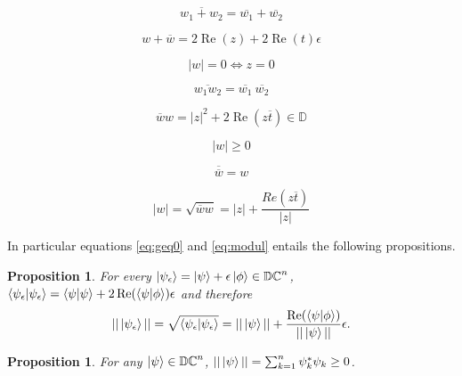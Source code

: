 \documentclass{article}
\newtheorem{proposition}[theorem]{Proposition}
\newcommand{\D}{\mathbb{D}}
\newcommand{\DC}{\mathbb{DC}}
\newcommand{\e}{\epsilon}
\renewcommand{\bar}{\overline}
\renewcommand{\Re}{\operatorname{Re}}
\begin{document}
\begin{multicols}{3}
\noindent \begin{equation}
\bar{w_1 + w_2} = \bar{w_1} + \bar{w_2}
\end{equation}

\noindent \begin{equation}
w + \bar{w} = 2 \Re(z) + 2 \Re(t) \e
\end{equation}

\noindent \begin{equation}
|w| = 0 \iff z = 0
\end{equation}

\columnbreak

\noindent \begin{equation}
\bar{w_1  w_2} = \bar{w_1} ~ \bar{w_2}
\end{equation}

\noindent \begin{equation}
\bar{w}w = |z|^2 + 2 \Re(z\bar{t}) \in \D
\end{equation}

\noindent \begin{equation}\label{eq:geq0}
|w| \geq 0
\end{equation}

\columnbreak

\noindent \begin{equation}
\bar{\bar{w}} = w
\end{equation}

\noindent \begin{equation}\label{eq:modul}
|w| = \sqrt{\bar{w}w} = |z| + \frac{Re(z\bar{t})}{|z|}
\end{equation}

\end{multicols}

In particular equations \ref{eq:geq0} and \ref{eq:modul} entails the following propositions.

\begin{proposition}
 For every $\ket{\psi_\e} = \ket{\psi} + \e \ket{\phi} \in \DC^n$, $\braket{\psi_\e|\psi_\e} = \braket{\psi|\psi} + 2\Re(\braket{\psi|\phi}) \e$ and therefore
\begin{equation}\label{eq:norm}
 ||\ket{\psi_\e}|| = \sqrt{\braket{\psi_\e|\psi_\e}} = ||\ket\psi|| + \frac{\Re(\braket{\psi|\phi})}{||\ket\psi||}\e.
\end{equation}
\end{proposition}
\begin{proposition}
 For any $\ket{\psi} \in \DC^n$, $||\ket\psi|| = \sum_{k=1}^n \psi_k^* \psi_k \geq 0$.
\end{proposition}
\end{document}

